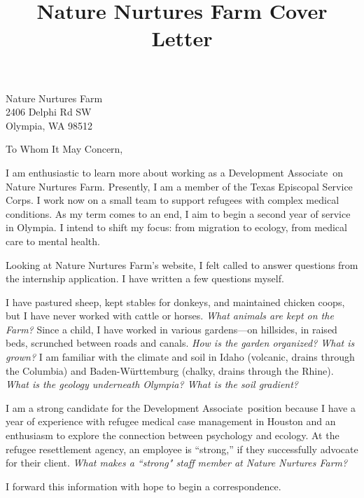 \documentclass{letter}
\title{Nature Nurtures Farm Cover Letter}
\newcommand{\jobtitle}{Development Associate}
\newcommand{\company}{Nature Nurtures Farm}
\begin{document}
\begin{letter}{Nature Nurtures Farm \\ 2406 Delphi Rd SW \\ Olympia, WA 98512}
\opening{To Whom It May Concern,}

I am enthusiastic to learn more about working as a \jobtitle\ on \company. Presently, I am a member of the Texas Episcopal Service Corps. I work now on a small team to support refugees with complex medical conditions. As my term comes to an end, I aim to begin a second year of service in Olympia. I intend to shift my focus: from migration to ecology, from medical care to mental health. 

Looking at \company's website, I felt called to answer questions from the internship application. I have written a few questions myself.

I have pastured sheep, kept stables for donkeys, and maintained chicken coops, but I have never worked with cattle or horses. \emph{What animals are kept on the Farm?} Since a child, I have worked in various gardens---on hillsides, in raised beds, scrunched between roads and canals. \emph{How is the garden organized? What is grown?} I am familiar with the climate and soil in Idaho (volcanic, drains through the Columbia) and Baden-W\"urttemburg (chalky, drains through the Rhine). \emph{What is the geology underneath Olympia? What is the soil gradient?}

I am a strong candidate for the \jobtitle\ position because I have a year of experience with refugee medical case management in Houston and an enthusiasm to explore the connection between psychology and ecology. At the refugee resettlement agency, an employee is ``strong,'' if they successfully advocate for their client. \emph{What makes a ``strong" staff member at \company?}

I forward this information with hope to begin a correspondence.




\end{letter}
\end{document}
